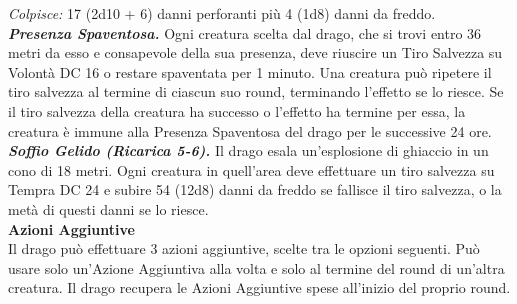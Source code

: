 \begin{multicols}{2}
\emph{Colpisce:} 17 (2d10 + 6) danni perforanti più 4 (1d8) danni da freddo.\\
\emph{\textbf{Presenza Spaventosa.}} Ogni creatura scelta dal drago, che si trovi entro 36 metri da esso e consapevole della sua presenza, deve riuscire un Tiro Salvezza su Volontà DC  16 o restare spaventata per 1 minuto. Una creatura può ripetere il tiro salvezza al termine di ciascun suo round, terminando l'effetto se lo riesce. Se il tiro salvezza della creatura ha successo o l'effetto ha termine per essa, la creatura è immune alla Presenza Spaventosa del drago per le successive 24 ore.\\
\emph{\textbf{Soffio Gelido (Ricarica 5-6).}} Il drago esala un'esplosione di ghiaccio in un cono di 18 metri. Ogni creatura in quell'area deve effettuare un tiro salvezza su Tempra DC  24 e subire 54 (12d8) danni da freddo se fallisce il tiro salvezza, o la metà di questi danni se lo riesce.\\
\textbf{Azioni Aggiuntive} \\
Il drago può effettuare 3 azioni aggiuntive, scelte tra le opzioni seguenti. Può usare solo un'Azione Aggiuntiva alla volta e solo al termine del round di un'altra creatura. Il drago recupera le Azioni Aggiuntive spese all'inizio del proprio round.


\end{multicols}
